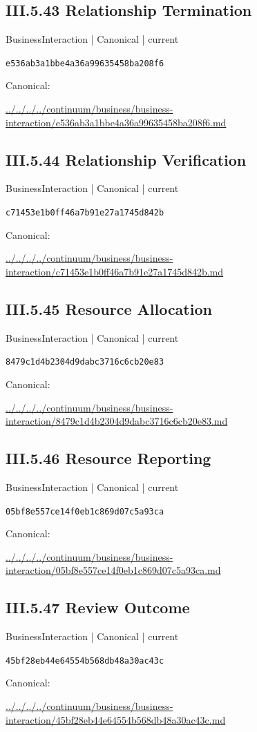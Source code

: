 \documentclass[10pt,a4paper]{article}
\begin{document}
\subsection*{III.5.43 Relationship Termination}
{\small BusinessInteraction | Canonical | current}\par
\texttt{e536ab3a1bbe4a36a99635458ba208f6}\par
Canonical: \par
{\footnotesize\url{../../../../continuum/business/business-interaction/e536ab3a1bbe4a36a99635458ba208f6.md}}\par
\subsection*{III.5.44 Relationship Verification}
{\small BusinessInteraction | Canonical | current}\par
\texttt{c71453e1b0ff46a7b91e27a1745d842b}\par
Canonical: \par
{\footnotesize\url{../../../../continuum/business/business-interaction/c71453e1b0ff46a7b91e27a1745d842b.md}}\par
\subsection*{III.5.45 Resource Allocation}
{\small BusinessInteraction | Canonical | current}\par
\texttt{8479c1d4b2304d9dabc3716c6cb20e83}\par
Canonical: \par
{\footnotesize\url{../../../../continuum/business/business-interaction/8479c1d4b2304d9dabc3716c6cb20e83.md}}\par
\subsection*{III.5.46 Resource Reporting}
{\small BusinessInteraction | Canonical | current}\par
\texttt{05bf8e557ce14f0eb1c869d07c5a93ca}\par
Canonical: \par
{\footnotesize\url{../../../../continuum/business/business-interaction/05bf8e557ce14f0eb1c869d07c5a93ca.md}}\par
\subsection*{III.5.47 Review Outcome}
{\small BusinessInteraction | Canonical | current}\par
\texttt{45bf28eb44e64554b568db48a30ac43c}\par
Canonical: \par
{\footnotesize\url{../../../../continuum/business/business-interaction/45bf28eb44e64554b568db48a30ac43c.md}}\par
\end{document}
